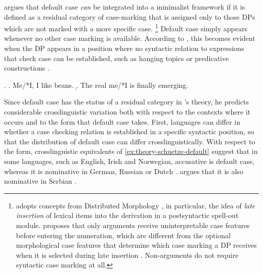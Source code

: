 \citet{schutze2001} argues that default case \textit{can} be integrated into a minimalist framework if it is defined as a residual category of case-marking that is assigned only to those DPs which are not marked with a more specific case.%
%
\footnote{\citeauthor{schutze2001} adopts concepts from Distributed Morphology  \citep{halle.marantz1993}, in particular, the idea of \textit{late insertion} of lexical items into the derivation in a postsyntactic spell-out module. \citeauthor{schutze2001} proposes that only arguments receive uninterpretable case features before entering the numeration, which are different from the optional morphological case features that determine which case marking a DP receives when it is selected during late insertion \citep[230--231]{schutze2001}. Non-arguments do not require syntactic case marking at all.}\afterfn%
%
Default case simply appears whenever no other case marking is available. According to \citeauthor{schutze2001}, this becomes evident when the DP appears in a position where no syntactic relation to expressions that check case can be established, such as hanging topics \Next[a] or predicative constructions \Next[b]. 

\ex. \label{ex:theory-schuetze-default}
\a. Me/*I, I like beans. \hfill \citep[210]{schutze2001}
\b. The real me/*I is finally emerging. \hfill \citep[215]{schutze2001}

Since default case has the status of a residual category in \citeauthor{schutze2001}'s theory, he predicts considerable crosslinguistic variation both with respect to the contexts where it occurs and to the form that default case takes. First, languages can differ in whether a case checking relation is established in a specific syntactic position, so that the distribution of default case can differ crosslinguistically. With respect to the form, crosslinguistic equivalents of \ref{ex:theory-schuetze-default} suggest that in some languages, such as English, Irish and Norwegian, accusative is default case, whereas it is nominative in German, Russian or Dutch \citep[229]{schutze2001}. \citet[51]{progovac2006} argues that it is also nominative in Serbian \Next.

